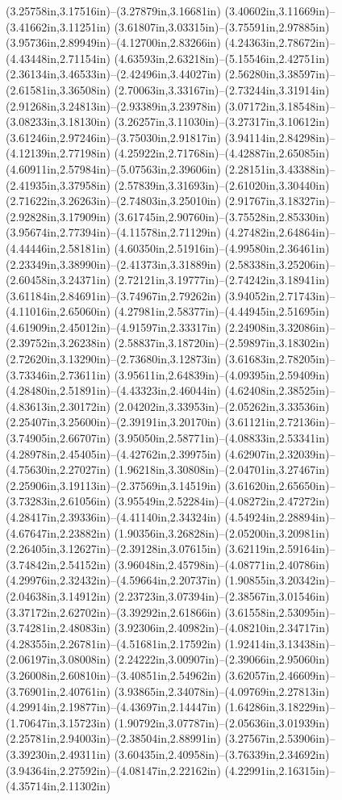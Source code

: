 (3.25758in,3.17516in)--(3.27879in,3.16681in) (3.40602in,3.11669in)--(3.41662in,3.11251in) (3.61807in,3.03315in)--(3.75591in,2.97885in) (3.95736in,2.89949in)--(4.12700in,2.83266in) (4.24363in,2.78672in)--(4.43448in,2.71154in) (4.63593in,2.63218in)--(5.15546in,2.42751in) (2.36134in,3.46533in)--(2.42496in,3.44027in) (2.56280in,3.38597in)--(2.61581in,3.36508in) (2.70063in,3.33167in)--(2.73244in,3.31914in) (2.91268in,3.24813in)--(2.93389in,3.23978in) (3.07172in,3.18548in)--(3.08233in,3.18130in) (3.26257in,3.11030in)--(3.27317in,3.10612in) (3.61246in,2.97246in)--(3.75030in,2.91817in) (3.94114in,2.84298in)--(4.12139in,2.77198in) (4.25922in,2.71768in)--(4.42887in,2.65085in) (4.60911in,2.57984in)--(5.07563in,2.39606in) (2.28151in,3.43388in)--(2.41935in,3.37958in) (2.57839in,3.31693in)--(2.61020in,3.30440in) (2.71622in,3.26263in)--(2.74803in,3.25010in) (2.91767in,3.18327in)--(2.92828in,3.17909in) (3.61745in,2.90760in)--(3.75528in,2.85330in) (3.95674in,2.77394in)--(4.11578in,2.71129in) (4.27482in,2.64864in)--(4.44446in,2.58181in) (4.60350in,2.51916in)--(4.99580in,2.36461in) (2.23349in,3.38990in)--(2.41373in,3.31889in) (2.58338in,3.25206in)--(2.60458in,3.24371in) (2.72121in,3.19777in)--(2.74242in,3.18941in) (3.61184in,2.84691in)--(3.74967in,2.79262in) (3.94052in,2.71743in)--(4.11016in,2.65060in) (4.27981in,2.58377in)--(4.44945in,2.51695in) (4.61909in,2.45012in)--(4.91597in,2.33317in) (2.24908in,3.32086in)--(2.39752in,3.26238in) (2.58837in,3.18720in)--(2.59897in,3.18302in) (2.72620in,3.13290in)--(2.73680in,3.12873in) (3.61683in,2.78205in)--(3.73346in,2.73611in) (3.95611in,2.64839in)--(4.09395in,2.59409in) (4.28480in,2.51891in)--(4.43323in,2.46044in) (4.62408in,2.38525in)--(4.83613in,2.30172in) (2.04202in,3.33953in)--(2.05262in,3.33536in) (2.25407in,3.25600in)--(2.39191in,3.20170in) (3.61121in,2.72136in)--(3.74905in,2.66707in) (3.95050in,2.58771in)--(4.08833in,2.53341in) (4.28978in,2.45405in)--(4.42762in,2.39975in) (4.62907in,2.32039in)--(4.75630in,2.27027in) (1.96218in,3.30808in)--(2.04701in,3.27467in) (2.25906in,3.19113in)--(2.37569in,3.14519in) (3.61620in,2.65650in)--(3.73283in,2.61056in) (3.95549in,2.52284in)--(4.08272in,2.47272in) (4.28417in,2.39336in)--(4.41140in,2.34324in) (4.54924in,2.28894in)--(4.67647in,2.23882in) (1.90356in,3.26828in)--(2.05200in,3.20981in) (2.26405in,3.12627in)--(2.39128in,3.07615in) (3.62119in,2.59164in)--(3.74842in,2.54152in) (3.96048in,2.45798in)--(4.08771in,2.40786in) (4.29976in,2.32432in)--(4.59664in,2.20737in) (1.90855in,3.20342in)--(2.04638in,3.14912in) (2.23723in,3.07394in)--(2.38567in,3.01546in) (3.37172in,2.62702in)--(3.39292in,2.61866in) (3.61558in,2.53095in)--(3.74281in,2.48083in) (3.92306in,2.40982in)--(4.08210in,2.34717in) (4.28355in,2.26781in)--(4.51681in,2.17592in) (1.92414in,3.13438in)--(2.06197in,3.08008in) (2.24222in,3.00907in)--(2.39066in,2.95060in) (3.26008in,2.60810in)--(3.40851in,2.54962in) (3.62057in,2.46609in)--(3.76901in,2.40761in) (3.93865in,2.34078in)--(4.09769in,2.27813in) (4.29914in,2.19877in)--(4.43697in,2.14447in) (1.64286in,3.18229in)--(1.70647in,3.15723in) (1.90792in,3.07787in)--(2.05636in,3.01939in) (2.25781in,2.94003in)--(2.38504in,2.88991in) (3.27567in,2.53906in)--(3.39230in,2.49311in) (3.60435in,2.40958in)--(3.76339in,2.34692in) (3.94364in,2.27592in)--(4.08147in,2.22162in) (4.22991in,2.16315in)--(4.35714in,2.11302in) 